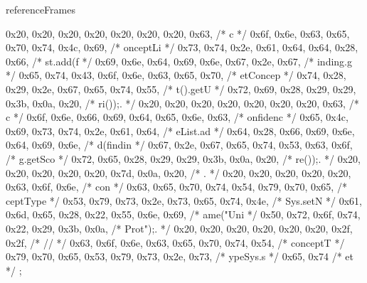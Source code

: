 \begin{chunk}{referenceFrames}
{{{{{{0x20, 0x20, 0x20, 0x20, 0x20, 0x20, 0x20, 0x63, /*        c */
0x6f, 0x6e, 0x63, 0x65, 0x70, 0x74, 0x4c, 0x69, /* onceptLi */
0x73, 0x74, 0x2e, 0x61, 0x64, 0x64, 0x28, 0x66, /* st.add(f */
0x69, 0x6e, 0x64, 0x69, 0x6e, 0x67, 0x2e, 0x67, /* inding.g */
0x65, 0x74, 0x43, 0x6f, 0x6e, 0x63, 0x65, 0x70, /* etConcep */
0x74, 0x28, 0x29, 0x2e, 0x67, 0x65, 0x74, 0x55, /* t().getU */
0x72, 0x69, 0x28, 0x29, 0x29, 0x3b, 0x0a, 0x20, /* ri());.  */
0x20, 0x20, 0x20, 0x20, 0x20, 0x20, 0x20, 0x63, /*        c */
0x6f, 0x6e, 0x66, 0x69, 0x64, 0x65, 0x6e, 0x63, /* onfidenc */
0x65, 0x4c, 0x69, 0x73, 0x74, 0x2e, 0x61, 0x64, /* eList.ad */
0x64, 0x28, 0x66, 0x69, 0x6e, 0x64, 0x69, 0x6e, /* d(findin */
0x67, 0x2e, 0x67, 0x65, 0x74, 0x53, 0x63, 0x6f, /* g.getSco */
0x72, 0x65, 0x28, 0x29, 0x29, 0x3b, 0x0a, 0x20, /* re());.  */
0x20, 0x20, 0x20, 0x20, 0x20, 0x7d, 0x0a, 0x20, /*      }.  */
0x20, 0x20, 0x20, 0x20, 0x20, 0x63, 0x6f, 0x6e, /*      con */
0x63, 0x65, 0x70, 0x74, 0x54, 0x79, 0x70, 0x65, /* ceptType */
0x53, 0x79, 0x73, 0x2e, 0x73, 0x65, 0x74, 0x4e, /* Sys.setN */
0x61, 0x6d, 0x65, 0x28, 0x22, 0x55, 0x6e, 0x69, /* ame("Uni */
0x50, 0x72, 0x6f, 0x74, 0x22, 0x29, 0x3b, 0x0a, /* Prot");. */
0x20, 0x20, 0x20, 0x20, 0x20, 0x20, 0x2f, 0x2f, /*       // */
0x63, 0x6f, 0x6e, 0x63, 0x65, 0x70, 0x74, 0x54, /* conceptT */
0x79, 0x70, 0x65, 0x53, 0x79, 0x73, 0x2e, 0x73, /* ypeSys.s */
0x65, 0x74                                      /* et */
};

}}}}
\end{chunk}
